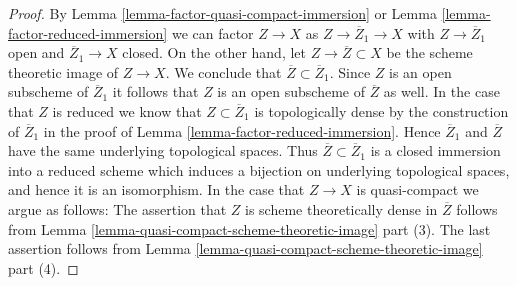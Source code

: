 \documentclass[10pt,a4paper]{amsart}
\theoremstyle{plain}
\theoremstyle{definition}
\theoremstyle{remark}
\numberwithin{equation}{subsection}
\begin{document}
\begin{proof}
By Lemma \ref{lemma-factor-quasi-compact-immersion} or
Lemma \ref{lemma-factor-reduced-immersion} we can factor
$Z \to X$ as $Z \to \overline{Z}_1 \to X$ with $Z \to \overline{Z}_1$
open and $\overline{Z}_1 \to X$ closed. On the other hand, let
$Z \to \overline{Z} \subset X$ be the scheme theoretic image of
$Z \to X$. We conclude that $\overline{Z} \subset \overline{Z}_1$.
Since $Z$ is an open subscheme of $\overline{Z}_1$ it follows
that $Z$ is an open subscheme of $\overline{Z}$ as well.
In the case that $Z$ is reduced we know that $Z \subset \overline{Z}_1$
is topologically dense by the construction of $\overline{Z}_1$ in
the proof of Lemma \ref{lemma-factor-reduced-immersion}.
Hence $\overline{Z}_1$ and $\overline{Z}$ have the same
underlying topological spaces. Thus $\overline{Z} \subset \overline{Z}_1$
is a closed immersion into a reduced scheme which induces a bijection
on underlying topological spaces, and hence it is an isomorphism.
In the case that $Z \to X$ is quasi-compact we argue as follows:
The assertion that $Z$ is scheme theoretically dense in
$\overline{Z}$ follows from
Lemma \ref{lemma-quasi-compact-scheme-theoretic-image} part (3).
The last assertion follows from
Lemma \ref{lemma-quasi-compact-scheme-theoretic-image} part (4).
\end{proof}
\end{document}
